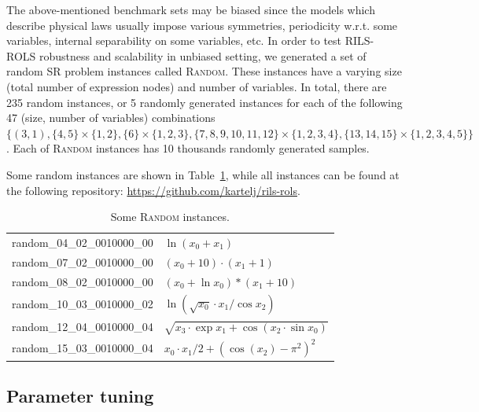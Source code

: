 \documentclass{bmcart}
\begin{document}
The above-mentioned benchmark sets may be biased since the models which describe physical laws usually impose   various symmetries, periodicity w.r.t. some variables, internal separability on some variables, etc. In order to test \textsc{RILS-ROLS} robustness and scalability in unbiased setting, we generated a set of random SR problem instances called \textsc{Random}. These instances have a varying size (total number of expression nodes) and number of variables. In total, there are 235 random instances, or 5 randomly generated instances for each of the following 47 (size, number of variables) combinations $\{(3, 1), \{4, 5\} \times \{1, 2\}, \{6\} \times \{1, 2, 3\}, \{7, 8, 9, 10, 11, 12\} \times \{1, 2, 3, 4\}, \{13, 14, 15\} \times \{1, 2, 3, 4, 5\}\}$. Each of \textsc{Random} instances has 10 thousands randomly generated samples. 

Some random instances are shown in Table~\ref{table:random}, while all instances can be found at %
 the following repository: \url{https://github.com/kartelj/rils-rols}.  

\begin{table}
	\centering
	\begin{tabular}{ll} \\ \hline
		random\_04\_02\_0010000\_00 &	$\ln{(x_0 + x_1)}$\\
		random\_07\_02\_0010000\_00 &	$(x_0 + 10)\cdot (x_1 + 1)$\\
		random\_08\_02\_0010000\_00 &	$(x_0 + \ln{x_0})*(x_1 + 10)$\\
		random\_10\_03\_0010000\_02 &	$\ln{(\sqrt{x_0} \cdot x_1/\cos{x_2})}$\\
		random\_12\_04\_0010000\_04 &	$\sqrt{x_3 \cdot \exp{x_1} + \cos{(x_2 \cdot \sin{x_0})}}$\\
		random\_15\_03\_0010000\_04	&   $x_0 \cdot x_1/2 + (\cos{(x_2)} - \pi^2)^2$\\
		\hline
	\end{tabular}
	\caption{Some \textsc{Random} instances.}
	\label{table:random}
\end{table}

\subsection{Parameter tuning}
\end{document}
